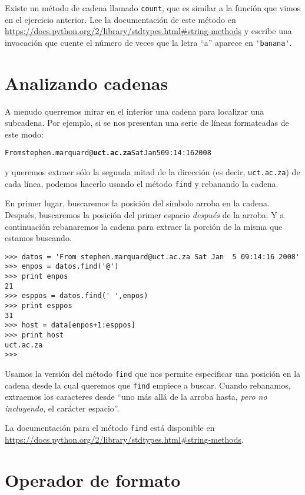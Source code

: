 \begin{ex}

Existe un método de cadena llamado {\tt count}, que es similar a la función
que vimos en el ejercicio anterior. Lee la documentación
de este método en
\url{https://docs.python.org/2/library/stdtypes.html#string-methods}
y escribe una invocación que cuente el número de veces que
la letra ``a'' aparece
en \verb"'banana'".
\end{ex}

\section{Analizando cadenas}

A menudo querremos mirar en el interior una cadena para localizar una subcadena. Por ejemplo,
si se nos presentan una serie de líneas formateadas de este modo:

\beforeverb
\begin{alltt}
From stephen.marquard@{\bf uct.ac.za} Sat Jan  5 09:14:16 2008
\end{alltt}
\afterverb

y queremos extraer sólo la segunda mitad de la dirección (es decir,
{\tt uct.ac.za}) de cada línea, podemos hacerlo usando el método
{\tt find} y rebanando la cadena.

En primer lugar, buscaremos la posición del símbolo arroba en la cadena. Después,
buscaremos la posición del primer espacio \emph{después} de la arroba. Y a continuación
rebanaremos la cadena para extraer la porción de la misma que estamos
buscando.

\beforeverb
\begin{verbatim}
>>> datos = 'From stephen.marquard@uct.ac.za Sat Jan  5 09:14:16 2008'
>>> enpos = datos.find('@')
>>> print enpos
21
>>> esppos = datos.find(' ',enpos)
>>> print esppos
31
>>> host = data[enpos+1:esppos]
>>> print host
uct.ac.za
>>> 
\end{verbatim}
\afterverb
%
Usamos la versión del método {\tt find} que nos permite especificar
una posición en la cadena desde la cual queremos que {\tt find} empiece a buscar.
Cuando rebanamos, extraemos los caracteres
desde ``uno más allá de la arroba hasta, \emph{pero no incluyendo}, el
carácter espacio''.

La documentación para el método {\tt find} está disponible en 
\url{https://docs.python.org/2/library/stdtypes.html#string-methods}.

\section{Operador de formato}


